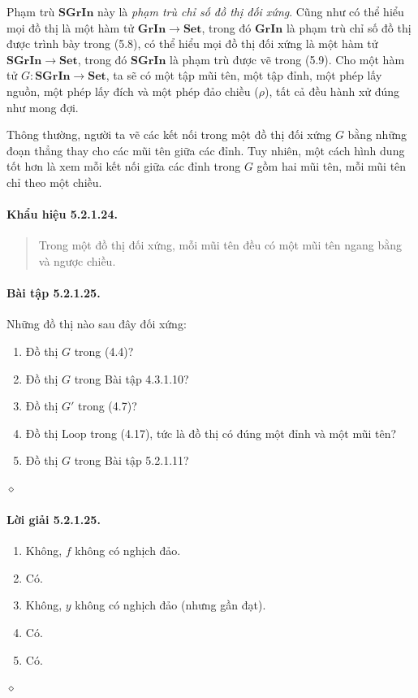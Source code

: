 Phạm trù $\mathbf{SGrIn}$ này là \emph{phạm trù chỉ số đồ thị đối xứng}. Cũng như có thể hiểu mọi đồ thị là một hàm tử $\mathbf{GrIn}\to\mathbf{Set}$, trong đó $\mathbf{GrIn}$ là phạm trù chỉ số đồ thị được trình bày trong (5.8), có thể hiểu mọi đồ thị đối xứng là một hàm tử $\mathbf{SGrIn}\to\mathbf{Set}$, trong đó $\mathbf{SGrIn}$ là phạm trù được vẽ trong (5.9). Cho một hàm tử $G:\mathbf{SGrIn}\to\mathbf{Set}$, ta sẽ có một tập mũi tên, một tập đỉnh, một phép lấy nguồn, một phép lấy đích và một phép đảo chiều ($\rho$), tất cả đều hành xử đúng như mong đợi.

Thông thường, người ta vẽ các kết nối trong một đồ thị đối xứng $G$ bằng những đoạn thẳng thay cho các mũi tên giữa các đỉnh. Tuy nhiên, một cách hình dung tốt hơn là xem mỗi kết nối giữa các đỉnh trong $G$ gồm hai mũi tên, mỗi mũi tên chỉ theo một chiều.
\paragraph{Khẩu hiệu 5.2.1.24.}\begin{quote}Trong một đồ thị đối xứng, mỗi mũi tên đều có một mũi tên ngang bằng và ngược chiều.\end{quote}
\paragraph{Bài tập 5.2.1.25.} Những đồ thị nào sau đây đối xứng:
\begin{enumerate}[label=\alph*.]
\item Đồ thị $G$ trong (4.4)?
\item Đồ thị $G$ trong Bài tập 4.3.1.10?
\item Đồ thị $G'$ trong (4.7)?
\item Đồ thị $\mathrm{Loop}$ trong (4.17), tức là đồ thị có đúng một đỉnh và một mũi tên?
\item Đồ thị $G$ trong Bài tập 5.2.1.11?
\end{enumerate}\hfill$\diamond$
\paragraph{Lời giải 5.2.1.25.}
\begin{enumerate}[label=\alph*.]
\item Không, $f$ không có nghịch đảo.
\item Có.
\item Không, $y$ không có nghịch đảo (nhưng gần đạt).
\item Có.
\item Có.
\end{enumerate}\hfill$\diamond$
